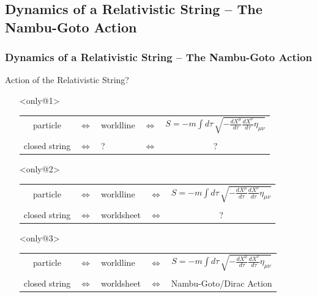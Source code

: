 \documentclass[aspectratio=169]{beamer}
\begin{document}
	\subsection{Dynamics of a Relativistic String -- The Nambu-Goto Action}
	
	\begin{frame}[t]
		\frametitle{Dynamics of a Relativistic String -- The Nambu-Goto Action}
		Action of the Relativistic String?
		\begin{itemize}
			\item[]<only@1>
			\begin{center}
				\begin{tabular}{ccp{1.8cm}cc}
					particle & $\Leftrightarrow$ & worldline & $\Leftrightarrow$ & ${\displaystyle S = -m \int d\tau \,\sqrt{-\frac{dX^\mu}{d\tau} \frac{dX^\nu}{d\tau}\eta_{\mu\nu}} }$ \\
					&&&&\\
					closed string & $\Leftrightarrow$ &\hphantom{worl} ? \hphantom{heet}& $\Leftrightarrow$ & ? \\
				\end{tabular}
			\end{center}
			\item[]<only@2>
			\begin{center}
				\begin{tabular}{ccp{1.8cm}cc}
					particle & $\Leftrightarrow$ & worldline & $\Leftrightarrow$ & ${\displaystyle S = -m \int d\tau \,\sqrt{-\frac{dX^\mu}{d\tau} \frac{dX^\nu}{d\tau}\eta_{\mu\nu}} }$ \\
					&&&&\\
					closed string & $\Leftrightarrow$ & worldsheet & $\Leftrightarrow$ & ? \\
				\end{tabular}
			\end{center}
			\item[]<only@3>
			\begin{center}
				\begin{tabular}{ccp{1.8cm}cc}
					particle & $\Leftrightarrow$ & worldline & $\Leftrightarrow$ & ${\displaystyle S = -m \int d\tau \,\sqrt{-\frac{dX^\mu}{d\tau} \frac{dX^\nu}{d\tau}\eta_{\mu\nu}} }$ \\
					&&&&\\
					closed string & $\Leftrightarrow$ & worldsheet & $\Leftrightarrow$ & Nambu-Goto/Dirac Action \\
				\end{tabular}
			\end{center}
		\end{itemize}
	\end{frame}
\end{document}
